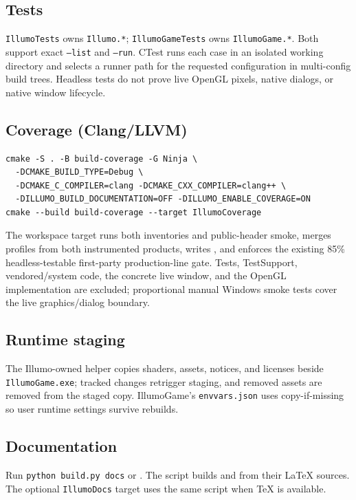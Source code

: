 \subsection{Tests}
\texttt{IllumoTests} owns \texttt{Illumo.*}; \texttt{IllumoGameTests} owns
\texttt{IllumoGame.*}. Both support exact \texttt{--list} and \texttt{--run}.
CTest runs each case in an isolated working directory and selects a runner path
for the requested configuration in multi-config build trees. Headless tests do
not prove live OpenGL pixels, native dialogs, or native window lifecycle.

\subsection{Coverage (Clang/LLVM)}
\begin{lstlisting}[language={}]
cmake -S . -B build-coverage -G Ninja \
  -DCMAKE_BUILD_TYPE=Debug \
  -DCMAKE_C_COMPILER=clang -DCMAKE_CXX_COMPILER=clang++ \
  -DILLUMO_BUILD_DOCUMENTATION=OFF -DILLUMO_ENABLE_COVERAGE=ON
cmake --build build-coverage --target IllumoCoverage
\end{lstlisting}
The workspace target runs both inventories and public-header smoke, merges
profiles from both instrumented products, writes
, and enforces the existing
85\% headless-testable first-party production-line gate. Tests, TestSupport,
vendored/system code, the concrete live window, and the OpenGL implementation
are excluded; proportional manual Windows smoke tests cover the live
graphics/dialog boundary.

\subsection{Runtime staging}
The Illumo-owned helper copies shaders, assets, notices, and licenses beside
\texttt{IllumoGame.exe}; tracked changes retrigger staging, and removed assets
are removed from the staged copy. IllumoGame's \texttt{envvars.json} uses
copy-if-missing so user runtime settings survive rebuilds.

\subsection{Documentation}
Run \texttt{python build.py docs} or . The script builds
 and
 from their LaTeX sources. The
optional \texttt{IllumoDocs} target uses the same script when TeX is available.
